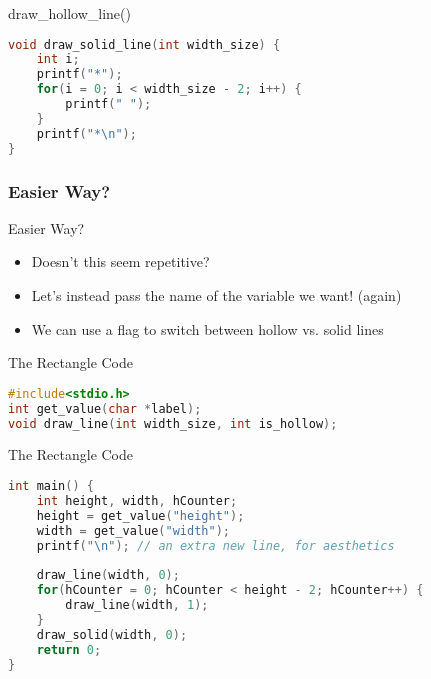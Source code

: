 \documentclass[graphics]{beamer}
\begin{document}
\begin{frame}[fragile]{draw\_hollow\_line()}
    \begin{lstlisting}[language=C,basicstyle=\footnotesize,keywordstyle=\color{blue},commentstyle=\color{green},showstringspaces=false,stringstyle=\color{red}]
void draw_solid_line(int width_size) {
    int i;
    printf("*");
    for(i = 0; i < width_size - 2; i++) {
        printf(" ");
    }
    printf("*\n");
}
    \end{lstlisting}
\end{frame}

\subsubsection{Easier Way?}
\begin{frame}{Easier Way?}
    \begin{itemize}
        \item Doesn't this seem repetitive?
        \pause
        \item Let's instead pass the name of the variable we want! (again)
        \item We can use a flag to switch between hollow vs. solid lines
    \end{itemize}
\end{frame}

\begin{frame}[fragile]{The Rectangle Code}
    \begin{lstlisting}[language=C,basicstyle=\footnotesize,keywordstyle=\color{blue},commentstyle=\color{green},showstringspaces=false,stringstyle=\color{red}]
#include<stdio.h>
int get_value(char *label);
void draw_line(int width_size, int is_hollow);
    \end{lstlisting}
\end{frame}

\begin{frame}[fragile]{The Rectangle Code}
    \begin{lstlisting}[language=C,basicstyle=\footnotesize,keywordstyle=\color{blue},commentstyle=\color{green},showstringspaces=false,stringstyle=\color{red}]
int main() {
    int height, width, hCounter;
    height = get_value("height");
    width = get_value("width");
    printf("\n"); // an extra new line, for aesthetics
    
    draw_line(width, 0);
    for(hCounter = 0; hCounter < height - 2; hCounter++) {
        draw_line(width, 1);
    }
    draw_solid(width, 0);
    return 0;
}
    \end{lstlisting}
\end{frame}
\end{document}
